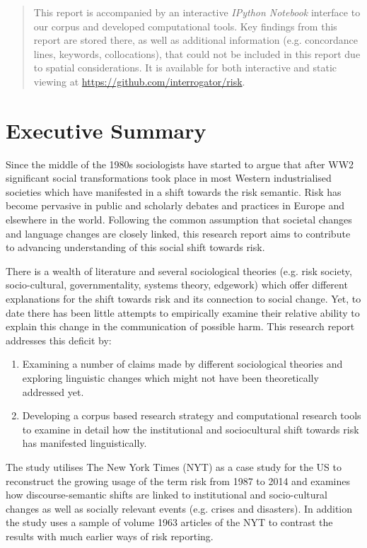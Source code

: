 \documentclass{report}
\begin{document}
\begin{abstract}
    This report is accompanied by an interactive \emph{IPython Notebook} interface to our corpus and developed computational tools. Key findings from this report are stored there, as well as additional information (e.g. concordance lines, keywords, collocations), that could not be included in this report due to spatial considerations. It is available for both interactive and static viewing at \url{https://github.com/interrogator/risk}.

    \end{abstract}
    \cleardoublepage
    \singlespacing
    \tableofcontents
    \onehalfspacing
    \cleardoublepage

\chapter{Executive Summary}

Since the middle of the 1980s sociologists have started to argue that after WW2 significant social transformations took place in most Western industrialised societies which have manifested in a shift towards the risk semantic. Risk has become pervasive in public and scholarly debates and practices in Europe and elsewhere in the world. Following the common assumption that societal changes and language changes are closely linked, this research report aims to contribute to advancing understanding of this social shift towards risk. 

There is a wealth of literature and several sociological theories (e.g. risk society, socio-cultural, governmentality, systems theory, edgework) which offer different explanations for the shift towards risk and its connection to social change. Yet, to date there has been little attempts to empirically examine their relative ability to explain this change in the communication of possible harm. This research report addresses this deficit by:
%
\begin{enumerate}
\item Examining a number of claims made by different sociological theories and exploring linguistic changes which might not have been theoretically addressed yet. 
\item Developing a corpus based research strategy and computational research tools to examine in detail how the institutional and sociocultural shift towards risk has manifested linguistically.
\end{enumerate}
%
The study utilises The New York Times (NYT) as a case study for the US to reconstruct the growing usage of the term risk from 1987 to 2014 and examines how discourse-semantic shifts are linked to institutional and socio-cultural changes as well as socially relevant events (e.g. crises and disasters). In addition the study uses a sample of volume 1963 articles of the NYT to contrast the results with much earlier ways of risk reporting.
\end{document}
